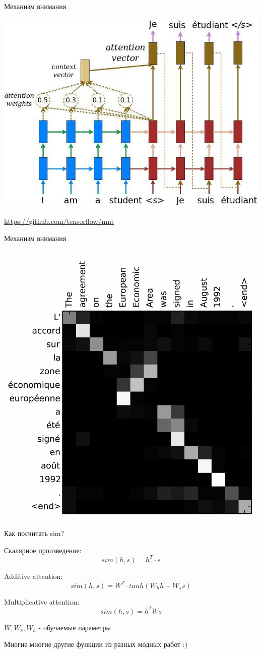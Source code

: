 \documentclass[notes,12pt, aspectratio=169]{beamer}
\newenvironment{wideitemize}{\itemize\addtolength{\itemsep}{10pt}}{\enditemize}
\begin{document}
\begin{frame}{Механизм внимания} 
\begin{center}
	\includegraphics[width=.6\linewidth]{attention_mechanism.jpg}
\end{center}
\vfill
\footnotesize
{\color{blue} \url{https://github.com/tensorflow/nmt}}
\end{frame}


\begin{frame}{Механизм внимания}
\begin{center}
	\includegraphics[width=0.47\linewidth]{undestend_attention}
\end{center}
\end{frame}


\begin{frame}{Как посчитать sim?} 
\begin{wideitemize}
	\item  Скалярное произведение: $$sim(h,s) = h^T\cdot s$$
	\item  Additive attention:  $$sim(h,s) = W^T \cdot tanh(W_hh+W_ss )$$	
	\item  Multiplicative attention: $$sim(h,s) = h^TWs$$	
	\item  $W, W_s, W_h$ - обучаемые параметры
	\item Многие-многие другие функции из разных модных работ :)
\end{wideitemize}
\end{frame}
\end{document}
